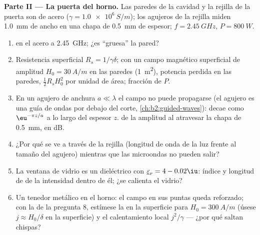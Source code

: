 \begin{problem}
\medskip
\noindent\textbf{Parte II --- La puerta del horno.}
Las paredes de la cavidad y la rejilla de la puerta son de acero ($\gamma = \qty{1.0e6}{S/m}$);
los agujeros de la rejilla miden \qty{1.0}{mm} de ancho en una chapa de \qty{0.5}{mm} de espesor;
$f = \qty{2.45}{GHz}$, $P = \qty{800}{W}$.
\begin{enumerate}[resume]
  \item {} en el acero a \qty{2.45}{GHz}; ¿es ``gruesa'' la pared?
  \item Resistencia superficial $R_s = 1/\gamma\delta$; con un campo magnético
        superficial de amplitud $H_0 = \qty{30}{A/m}$ en las paredes (\qty{1}{m^2}),
        potencia perdida en las paredes, $\tfrac12R_sH_0^2$ por unidad de área; fracción
        de $P$.
  \item En un agujero de anchura $a \ll \lambda$ el campo no puede propagarse (el
        agujero es una guía de ondas por debajo del corte, \cref{ch:b2:guided-waves}):
        decae como $\eu^{-\pi z/a}$ a lo largo del espesor $z$. 
        de la amplitud al atravesar la chapa de \qty{0.5}{mm}, en dB.
  \item ¿Por qué se ve a través de la rejilla (longitud de onda de la luz
        frente al tamaño del agujero) mientras que las microondas no pueden salir?
  \item La ventana de vidrio es un dieléctrico con $\underline\varepsilon_r = 4 - 0.02\iu$:
        índice y longitud de  de la intensidad dentro de él; ¿se
        calienta el vidrio?
  \item Un tenedor metálico en el horno: el campo en sus puntas queda reforzado;
        con la  de la pregunta 8, estímese la  en la superficie para $H_0 = \qty{300}{A/m}$ (úsese $j \approx H_0/\delta$
        en la superficie) y el calentamiento local $j^2/\gamma$ --- ¿por qué saltan chispas?
\end{enumerate}


\end{problem}
